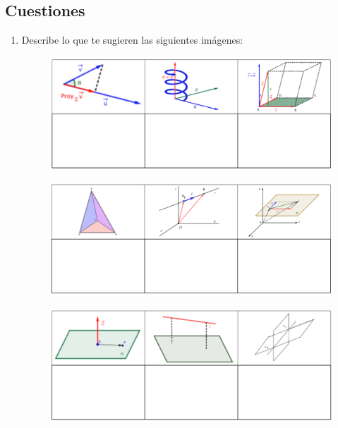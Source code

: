 \subsection{Cuestiones}
\begin{enumerate}[Q1. ]
\item Describe lo que te sugieren las siguientes imágenes:

	\begin{figure}[H]
		\centering
		\includegraphics[width=1\textwidth]{imagenes/imagenes11/T11IM35.png}
	\end{figure}

\vspace{-8mm}\hspace{-10mm}
	
	\begin{figure}[H]
		\centering
		\includegraphics[width=1\textwidth]{imagenes/imagenes11/T11IM36.png}
	\end{figure}

\vspace{-8mm}\hspace{-10mm}

\begin{figure}[H]
		\centering
		\includegraphics[width=1\textwidth]{imagenes/imagenes11/T11IM37.png}
	\end{figure}


\end{enumerate}
